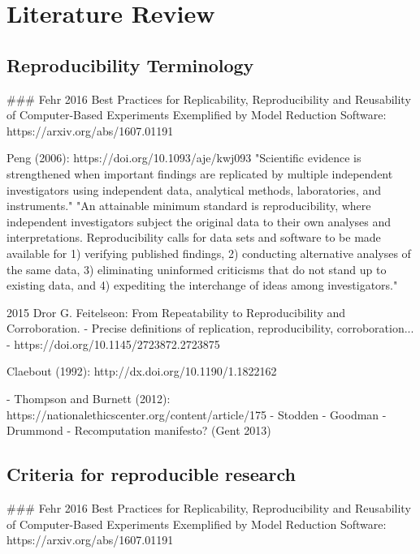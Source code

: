 
\chapter{Literature Review}
\section{Reproducibility Terminology}

### Fehr 2016  Best Practices for Replicability, Reproducibility and Reusability of Computer-Based Experiments Exemplified by Model Reduction Software: https://arxiv.org/abs/1607.01191


Peng (2006): https://doi.org/10.1093/aje/kwj093
"Scientific evidence is strengthened when important findings are replicated by multiple independent investigators using independent data, analytical methods, laboratories, and instruments."
"An attainable minimum standard is reproducibility, where independent investigators subject the original data to their own analyses and interpretations. Reproducibility calls for data sets and software to be made available for 1) verifying published findings, 2) conducting alternative analyses of the same data, 3) eliminating uninformed criticisms that do not stand up to existing data, and 4) expediting the interchange of ideas among investigators."

2015 Dror G. Feitelseon: From Repeatability to Reproducibility and Corroboration.
- Precise definitions of replication, reproducibility, corroboration...
- https://doi.org/10.1145/2723872.2723875

Claebout (1992): http://dx.doi.org/10.1190/1.1822162

- Thompson and Burnett (2012): https://nationalethicscenter.org/content/article/175
- Stodden
- Goodman
- Drummond
- Recomputation manifesto? (Gent 2013)

\section{Criteria for reproducible research}

### Fehr 2016  Best Practices for Replicability, Reproducibility and Reusability of Computer-Based Experiments Exemplified by Model Reduction Software: https://arxiv.org/abs/1607.01191

